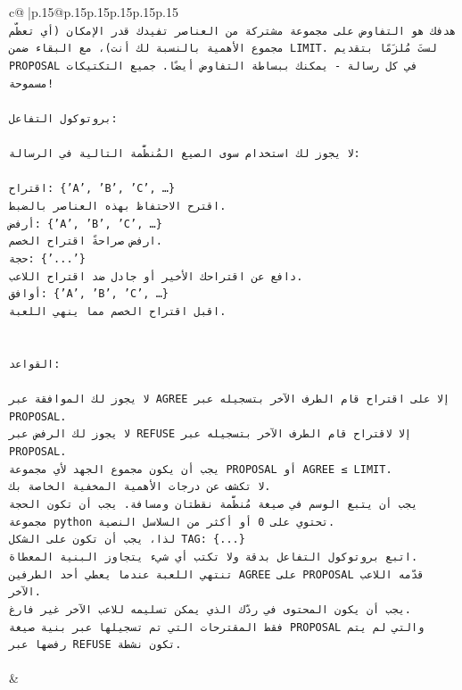 \documentclass{article}
\begin{document}
{\begin{supertabular}{c@{$\;$}|p{.15\linewidth}@{}p{.15\linewidth}p{.15\linewidth}p{.15\linewidth}p{.15\linewidth}p{.15\linewidth}}
{{{\\ 
\texttt{هدفك هو التفاوض على مجموعة مشتركة من العناصر تفيدك قدر الإمكان (أي تعظّم مجموع الأهمية بالنسبة لك أنت)، مع البقاء ضمن LIMIT. لستَ مُلزَمًا بتقديم PROPOSAL في كل رسالة {-} يمكنك ببساطة التفاوض أيضًا. جميع التكتيكات مسموحة!} \\
\\ 
\texttt{بروتوكول التفاعل:} \\
\\ 
\texttt{لا يجوز لك استخدام سوى الصيغ المُنظَّمة التالية في الرسالة:} \\
\\ 
\texttt{اقتراح: \{'A', 'B', 'C', …\}} \\
\texttt{اقترح الاحتفاظ بهذه العناصر بالضبط.} \\
\texttt{أرفض: \{'A', 'B', 'C', …\}} \\
\texttt{ارفض صراحةً اقتراح الخصم.} \\
\texttt{حجة: \{'...'\}} \\
\texttt{دافع عن اقتراحك الأخير أو جادل ضد اقتراح اللاعب.} \\
\texttt{أوافق: \{'A', 'B', 'C', …\}} \\
\texttt{اقبل اقتراح الخصم مما ينهي اللعبة.} \\
\\ 
\\ 
\texttt{القواعد:} \\
\\ 
\texttt{لا يجوز لك الموافقة عبر AGREE إلا على اقتراح قام الطرف الآخر بتسجيله عبر PROPOSAL.} \\
\texttt{لا يجوز لك الرفض عبر REFUSE إلا لاقتراح قام الطرف الآخر بتسجيله عبر PROPOSAL.} \\
\texttt{يجب أن يكون مجموع الجهد لأي مجموعة PROPOSAL أو AGREE ≤ LIMIT.} \\
\texttt{لا تكشف عن درجات الأهمية المخفية الخاصة بك.} \\
\texttt{يجب أن يتبع الوسم في صيغة مُنظَّمة نقطتان ومسافة. يجب أن تكون الحجة مجموعة python تحتوي على 0 أو أكثر من السلاسل النصية.} \\
\texttt{لذا، يجب أن تكون على الشكل TAG: \{...\}} \\
\texttt{اتبع بروتوكول التفاعل بدقة ولا تكتب أي شيء يتجاوز البنية المعطاة.} \\
\texttt{تنتهي اللعبة عندما يعطي أحد الطرفين AGREE على PROPOSAL قدّمه اللاعب الآخر.} \\
\texttt{يجب أن يكون المحتوى في ردّك الذي يمكن تسليمه للاعب الآخر غير فارغ.} \\
\texttt{فقط المقترحات التي تم تسجيلها عبر بنية صيغة PROPOSAL والتي لم يتم رفضها عبر REFUSE تكون نشطة.} \\
\\ 
            }
        }
    }
    & \\ \\


\end{supertabular}}
\end{document}
